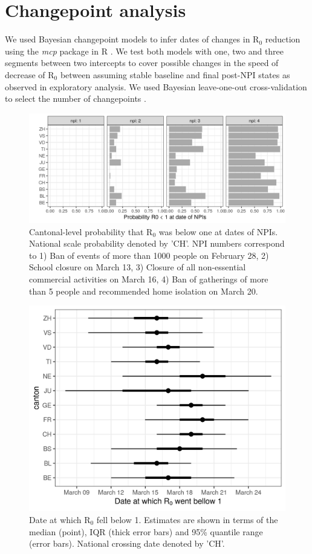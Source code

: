 \section{Changepoint analysis}

We used Bayesian changepoint models to infer dates of changes in R$_0$ reduction using the \textit{mcp} package in R \cite{lindelov_mcp_2020}. We test both models with one, two and three segments between two intercepts to cover possible changes in the speed of decrease of R$_0$ between assuming stable baseline and final post-NPI states as observed in exploratory analysis. We used Bayesian leave-one-out cross-validation to select the number of changepoints \cite{vehtari_practical_2017}.

\begin{figure}[!htb]
    \centering
    \includegraphics[width = .75\textwidth]{fig_covid-switzerland-npi/fig_supp/prob_r0_below_one.png}
    \caption[Cantonal-level probability that R$_0$ was below one at dates of NPIs]{Cantonal-level probability that R$_0$ was below one at dates of NPIs. National scale probability denoted by 'CH'. NPI numbers correspond to 1) Ban of events of more than 1000 people on February 28, 2) School closure on March 13, 3) Closure of all non-essential commercial activities on March 16, 4) Ban of gatherings of more than 5 people and recommended home isolation on March 20.}
    \label{fig:prob_r0_below_one}
\end{figure}

\begin{figure}[!htb]
    \centering
    \includegraphics[width = .4\textwidth]{fig_covid-switzerland-npi/fig_supp/date_crossing.png}
    \caption[Date at which R$_0$ fell below 1]{Date at which R$_0$ fell below 1. Estimates are shown in terms of the median (point), IQR (thick error bars) and 95\% quantile range (error bars). National crossing date denoted by 'CH'.}
    \label{fig:datecross}
\end{figure}

